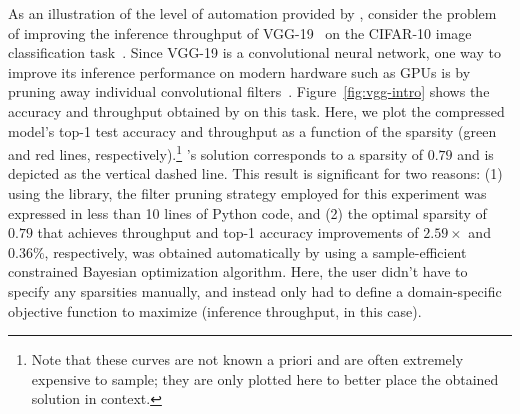 As an illustration of the level of automation provided by \algoName,
consider the problem of improving the
inference throughput of VGG-19~\cite{simonyan2014very} on the CIFAR-10 image
classification task~\cite{krizhevsky2014cifar}.
%
Since VGG-19 is a convolutional neural network, one way to improve its
inference performance on modern hardware such as GPUs is by pruning
away individual convolutional filters~\cite{he2018progressive}.
%
Figure~\ref{fig:vgg-intro} shows the accuracy and throughput obtained
by \algoName on this task.
%
Here, we plot the compressed model's top-1 test accuracy and throughput as a function of the sparsity (green and red lines,
respectively).\footnote{Note that these curves are not known a priori and
are often extremely expensive to sample;
they are only plotted here to better place the obtained solution in context.}
%
\algoName's solution corresponds to a sparsity of $0.79$
and is depicted as the vertical dashed line.
%
This result is significant for two reasons: (1) using the \algoName library,
the filter pruning strategy employed for this experiment was expressed in
less than 10 lines of Python code, and (2) the optimal sparsity of
$0.79$ that
achieves throughput and top-1 accuracy improvements of $2.59\times$ and $0.36\%$, respectively,
was obtained automatically by \algoName using a sample-efficient constrained
Bayesian optimization algorithm.
%
Here, the user didn't have to specify any
sparsities manually, and instead only had to define a domain-specific
objective function to maximize (inference throughput, in this case).


